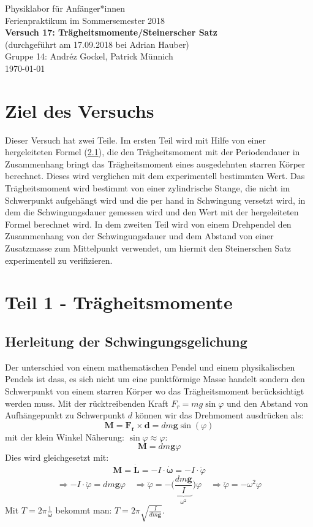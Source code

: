 \documentclass[11pt,a4paper]{article}
\renewcommand{\vec}{\boldsymbol}
\begin{document}
{
\centering 
\large 
Physiklabor für Anf\"anger*innen \\
Ferienpraktikum im Sommersemester 2018 \\[4mm]
\textbf{\LARGE 
Versuch 17: Trägheitsmomente/Steinerscher Satz
} \\[3mm]
(durchgef\"uhrt am 17.09.2018 bei Adrian Hauber)\\
Gruppe 14: Andréz Gockel, Patrick M\"unnich\\ 
\today \\[10mm]
}

\section{Ziel des Versuchs}

Dieser Versuch hat zwei Teile. Im ersten Teil wird mit Hilfe von einer hergeleiteten Formel (\ref{}), die den Trägheitsmoment mit der Periodendauer in Zusammenhang bringt das Trägheitsmoment eines ausgedehnten starren Körper berechnet. Dieses wird verglichen mit dem experimentell bestimmten Wert. Das Trägheitsmoment wird bestimmt von einer zylindrische Stange, die nicht im Schwerpunkt aufgehängt wird und die per hand in Schwingung versetzt wird, in dem die Schwingungsdauer gemessen wird und den Wert mit der hergeleiteten Formel berechnet wird. In dem zweiten Teil wird von einem Drehpendel den Zusammenhang von der Schwingungsdauer und dem Abstand von einer Zusatzmasse zum Mittelpunkt verwendet, um hiermit den Steinerschen Satz experimentell zu verifizieren. 

\section{Teil 1 - Trägheitsmomente}
\subsection{Herleitung der Schwingungsgelichung}

Der unterschied von einem mathematischen Pendel und einem physikalischen Pendels ist dass, es sich nicht um eine punktförmige Masse handelt sondern den Schwerpunkt von einem starren Körper wo das Trägheitsmoment berücksichtigt werden muss. Mit der rücktreibenden Kraft $F_r = mg\sin\varphi$ und den Abstand von Aufhängepunkt zu Schwerpunkt $d$ können wir das Drehmoment ausdrücken als:
$$\vec{M} = \vec{F_r} \times \vec{d} = dm\vec{g}\sin(\varphi)$$
mit der klein Winkel Näherung: $\sin\varphi \approx \varphi$:
$$\vec{M} = dm\vec{g}\varphi$$
Dies wird gleichgesetzt mit:
$$\vec{M} = \vec{\dot L} = - I \cdot \vec{\dot\omega} = - I \cdot \ddot \varphi$$
$$\Rightarrow - I \cdot \ddot \varphi = dm\vec{g}\varphi \quad \Rightarrow \ddot \varphi = - \bigg(\underbrace{\frac{dm\vec{g}}{I}}_{\omega^2}\bigg)\varphi \quad \Rightarrow \ddot \varphi = - \omega^2 \varphi$$
Mit $T = 2\pi \frac{1}{\vec{\omega}}$ bekommt man: $T = 2\pi \sqrt{\frac{I}{dm\vec{g}}}$.
\end{document}

